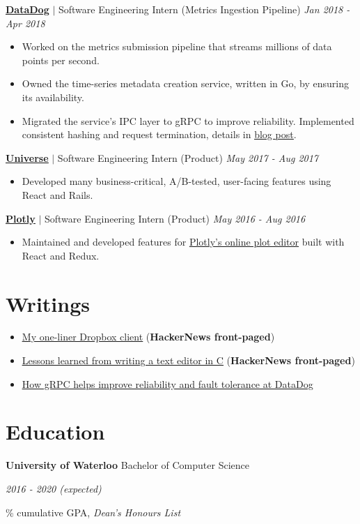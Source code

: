 \documentclass[paper=a4,fontsize=15pt]{scrartcl}
\newcommand{\smolboispace}{\vspace*{0.1em}}
\newcommand{\quarterspace}{\vspace*{0.25em}}
\newcommand{\bighalfspace}{\vspace*{0.75em}}
\begin{document}
\smolboispace
\smolboispace
\bighalfspace
\normalsize
\noindent \href{https://datadoghq.com}{\textbf{\ul{DataDog}}}
$\vert$ \small Software Engineering Intern (Metrics Ingestion Pipeline)
{\hfill \footnotesize \textit{Jan 2018 - Apr 2018}}
\begin{itemize}[noitemsep,leftmargin=20pt,label=\raisebox{0.25ex}{\tiny$\bullet$},topsep=5pt]
  \small
  \item Worked on the metrics submission pipeline that streams millions of data
    points per second.
  \item Owned the time-series metadata creation service, written in Go, by
    ensuring its availability.
  \item Migrated the service's IPC layer to gRPC to improve reliability.
    Implemented consistent hashing and request termination, details in
    \href{http://lpan.io/migrating-to-grpc}{\ul{blog post}}.
\end{itemize}

\smolboispace
\smolboispace
\bighalfspace
\normalsize
\noindent \href{https://universe.com}{\ul{\textbf{Universe}}}
$\vert$ \small Software Engineering Intern (Product)
{\hfill \footnotesize \textit{May 2017 - Aug 2017}}
\begin{itemize}[noitemsep,leftmargin=20pt,label=\raisebox{0.25ex}{\tiny$\bullet$},topsep=5pt]
  \small
  \item Developed many business-critical, A/B-tested, user-facing features
    using React and Rails.
\end{itemize}

\smolboispace
\smolboispace
\bighalfspace
\normalsize
\noindent \href{https://plot.ly}{\textbf{\ul{Plotly}}}
$\vert$ \small Software Engineering Intern (Product)
{\hfill \footnotesize \textit{May 2016 - Aug 2016}}
\begin{itemize}[noitemsep,leftmargin=20pt,label=\raisebox{0.25ex}{\tiny$\bullet$},topsep=5pt]
  \small
  \item Maintained and developed features for
    \href{https://plot.ly/chart-studio/}{\ul{Plotly's online plot editor}} built
    with React and Redux.
\end{itemize}

\section*{Writings}{}
\begin{itemize}[noitemsep,leftmargin=20pt,label=\raisebox{0.25ex}{\tiny$\bullet$},topsep=5pt]
  \small
  \item \href{http://lpan.io/one-liner-dropbox-client}{\ul{My one-liner Dropbox
        client}} (\textbf{HackerNews front-paged})
  \item \href{http://lpan.io/what-i-learnt-from-viw}{\ul{Lessons learned from
        writing a text editor in C}} (\textbf{HackerNews front-paged})
  \item \href{http://lpan.io/migrating-to-grpc}{\ul{How gRPC helps improve
        reliability and fault tolerance at DataDog}}
\end{itemize}

\section*{Education}{}
\noindent \textbf{University of Waterloo} Bachelor of Computer Science\par
\quarterspace
\footnotesize
\noindent \textit{2016 - 2020 (expected)} \par
{}\% cumulative GPA, \textit{Dean's Honours List}
\end{document}
